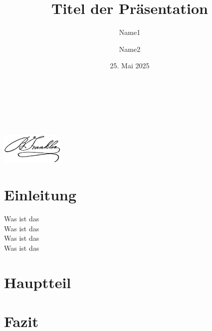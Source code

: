 \documentclass{beamer}
\title{Titel der Präsentation}
\author{Name1 \and Name2}
\date{25. Mai 2025}
\institute{Fakultät XY \\ Universität XYZ}
\newcommand{\mylogo}{\includegraphics[height=1.5cm]{images/logo.png}}
\begin{document}
\begin{frame}[plain]
  \begin{minipage}[t]{0.7\textwidth}
    \raggedright
    {\Huge \textbf{\inserttitle}}\\[3ex]
    {\Large \insertauthor}\\[2ex]
    {\large \insertinstitute}\\[1.5ex]
    {\large \insertdate}
  \end{minipage}%
  \hfill
  \begin{minipage}[t]{0.25\textwidth}
    \vspace{-0.7cm}
    \raggedleft
    \mylogo
  \end{minipage}
\end{frame}

\section{Einleitung}
\begin{frame}
    Was ist das \\
    Was ist das \\
    Was ist das \\
    Was ist das \\
\end{frame}

\section{Hauptteil}
\begin{frame}
\end{frame}

\section{Fazit}
\begin{frame}
\end{frame}
\end{document}

